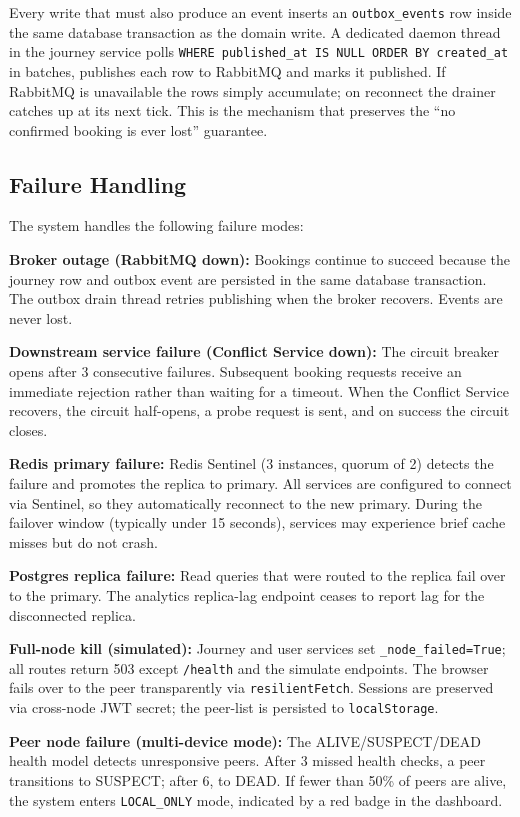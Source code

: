 \documentclass[12pt,a4paper]{article}
\begin{document}
Every write that must also produce an event inserts an \texttt{outbox\_events} row inside the same database transaction as the domain write. A dedicated daemon thread in the journey service polls \texttt{WHERE published\_at IS NULL ORDER BY created\_at} in batches, publishes each row to RabbitMQ and marks it published. If RabbitMQ is unavailable the rows simply accumulate; on reconnect the drainer catches up at its next tick. This is the mechanism that preserves the ``no confirmed booking is ever lost'' guarantee.

\subsection{Failure Handling}
 
The system handles the following failure modes:
 
\textbf{Broker outage (RabbitMQ down):} Bookings continue to succeed because the journey row and outbox event are persisted in the same database transaction. The outbox drain thread retries publishing when the broker recovers. Events are never lost.
 
\textbf{Downstream service failure (Conflict Service down):} The circuit breaker opens after 3 consecutive failures. Subsequent booking requests receive an immediate rejection rather than waiting for a timeout. When the Conflict Service recovers, the circuit half-opens, a probe request is sent, and on success the circuit closes.
 
\textbf{Redis primary failure:} Redis Sentinel (3 instances, quorum of 2) detects the failure and promotes the replica to primary. All services are configured to connect via Sentinel, so they automatically reconnect to the new primary. During the failover window (typically under 15 seconds), services may experience brief cache misses but do not crash.
 
\textbf{Postgres replica failure:} Read queries that were routed to the replica fail over to the primary. The analytics replica-lag endpoint ceases to report lag for the disconnected replica.
 
\textbf{Full-node kill (simulated):} Journey and user services set \texttt{\_node\_failed=True}; all routes return 503 except \texttt{/health} and the simulate endpoints. The browser fails over to the peer transparently via \texttt{resilientFetch}. Sessions are preserved via cross-node JWT secret; the peer-list is persisted to \texttt{localStorage}.

\textbf{Peer node failure (multi-device mode):} The ALIVE/SUSPECT/DEAD health model detects unresponsive peers. After 3 missed health checks, a peer transitions to SUSPECT; after 6, to DEAD. If fewer than 50\% of peers are alive, the system enters \texttt{LOCAL\_ONLY} mode, indicated by a red badge in the dashboard.
 
\end{document}
